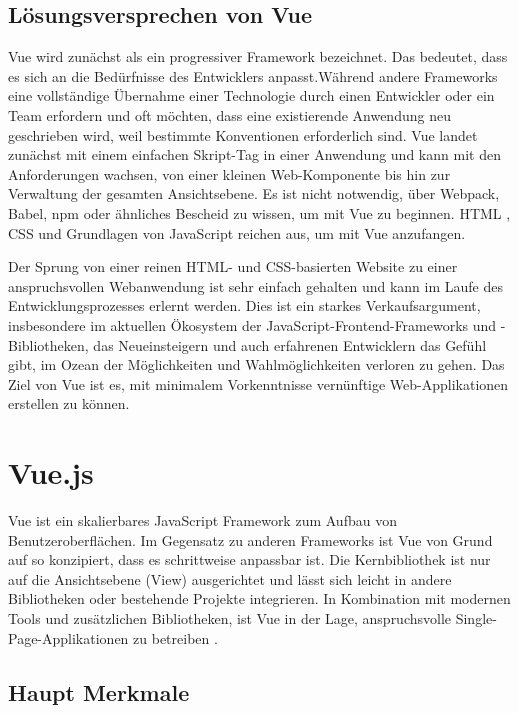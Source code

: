 ﻿
\section{Lösungsversprechen von Vue}
Vue wird zunächst als ein progressiver Framework bezeichnet.
Das bedeutet, dass es sich an die Bedürfnisse des Entwicklers anpasst.Während andere Frameworks eine vollständige Übernahme einer Technologie durch einen Entwickler oder ein Team erfordern und oft möchten, dass eine existierende Anwendung neu geschrieben wird, weil bestimmte Konventionen erforderlich sind. Vue landet zunächst mit einem einfachen Skript-Tag in einer Anwendung und kann mit den Anforderungen wachsen, von einer kleinen Web-Komponente bis hin zur Verwaltung der gesamten Ansichtsebene.
Es ist nicht notwendig, über Webpack, Babel, npm oder ähnliches Bescheid zu wissen, um mit Vue zu beginnen. HTML , CSS und Grundlagen von JavaScript reichen aus, um mit Vue anzufangen.

Der Sprung von einer reinen HTML- und CSS-basierten Website zu einer anspruchsvollen Webanwendung ist sehr einfach gehalten und kann im Laufe des Entwicklungsprozesses erlernt werden.
Dies ist ein starkes Verkaufsargument, insbesondere im aktuellen Ökosystem der JavaScript-Frontend-Frameworks und -Bibliotheken, das Neueinsteigern und auch erfahrenen Entwicklern das Gefühl gibt, im Ozean der Möglichkeiten und Wahlmöglichkeiten verloren zu gehen.
Das Ziel von Vue ist es, mit minimalem Vorkenntnisse vernünftige Web-Applikationen erstellen zu können.


{\let\clearpage\relax \chapter{Vue.js}}
\label{sec:grundlagen}

Vue ist ein skalierbares JavaScript Framework zum Aufbau von Benutzeroberflächen. Im Gegensatz zu anderen Frameworks ist Vue von Grund auf so konzipiert, dass es schrittweise anpassbar ist. Die Kernbibliothek ist nur auf die Ansichtsebene (View) ausgerichtet und lässt sich leicht in andere Bibliotheken oder bestehende Projekte integrieren. In Kombination mit modernen Tools und zusätzlichen Bibliotheken, ist Vue  in der Lage, anspruchsvolle Single-Page-Applikationen zu betreiben \cite{Vue019:Intro:Online}.

\section[]{Haupt Merkmale }
\label{sec:Einführung}


